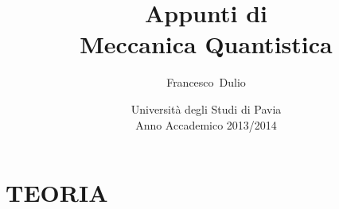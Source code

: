 \documentclass[a4paper,11pt,twoside,openany]{book}
\author{Francesco~Dulio}
\title{Appunti di \\Meccanica Quantistica}
\date{Università degli Studi di Pavia \\ Anno Accademico 2013/2014}
\theoremstyle{definition}
\theoremstyle{plain}
\theoremstyle{plain}
\theoremstyle{definition}
\begin{document}
\frontmatter
\maketitle
\tableofcontents
%


\mainmatter
\part{TEORIA}
 
 
 
 
 
 
\end{document}
